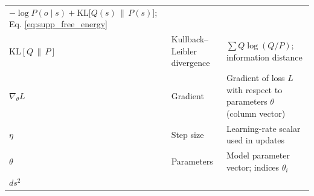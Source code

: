 \documentclass[
  10pt,
]{article}
\begin{document}
\begin{longtable}[]{@{}lll@{}}
\begin{minipage}[t]{0.30\columnwidth}
\(-\log P(o\mid s) + \mathrm{KL}\big[Q(s)\,\|\,P(s)\big]\); Eq.
\eqref{eq:supp_free_energy}\strut
\end{minipage}\tabularnewline
\begin{minipage}[t]{0.30\columnwidth}\raggedright
\(\mathrm{KL}[Q\,\|\,P]\)\strut
\end{minipage} & \begin{minipage}[t]{0.30\columnwidth}\raggedright
Kullback--Leibler divergence\strut
\end{minipage} & \begin{minipage}[t]{0.30\columnwidth}\raggedright
\(\sum Q\log(Q/P)\); information distance\strut
\end{minipage}\tabularnewline
\begin{minipage}[t]{0.30\columnwidth}\raggedright
\(\nabla_{\theta}L\)\strut
\end{minipage} & \begin{minipage}[t]{0.30\columnwidth}\raggedright
Gradient\strut
\end{minipage} & \begin{minipage}[t]{0.30\columnwidth}\raggedright
Gradient of loss \(L\) with respect to parameters \(\theta\) (column
vector)\strut
\end{minipage}\tabularnewline
\begin{minipage}[t]{0.30\columnwidth}\raggedright
\(\eta\)\strut
\end{minipage} & \begin{minipage}[t]{0.30\columnwidth}\raggedright
Step size\strut
\end{minipage} & \begin{minipage}[t]{0.30\columnwidth}\raggedright
Learning-rate scalar used in updates\strut
\end{minipage}\tabularnewline
\begin{minipage}[t]{0.30\columnwidth}\raggedright
\(\theta\)\strut
\end{minipage} & \begin{minipage}[t]{0.30\columnwidth}\raggedright
Parameters\strut
\end{minipage} & \begin{minipage}[t]{0.30\columnwidth}\raggedright
Model parameter vector; indices \(\theta_i\)\strut
\end{minipage}\tabularnewline
\begin{minipage}[t]{0.30\columnwidth}\raggedright
\(ds^2\)\strut
\end{minipage} & \begin{minipage}[t]{0.30\columnwidth}\raggedright

\end{minipage}
\end{longtable}
\end{document}
